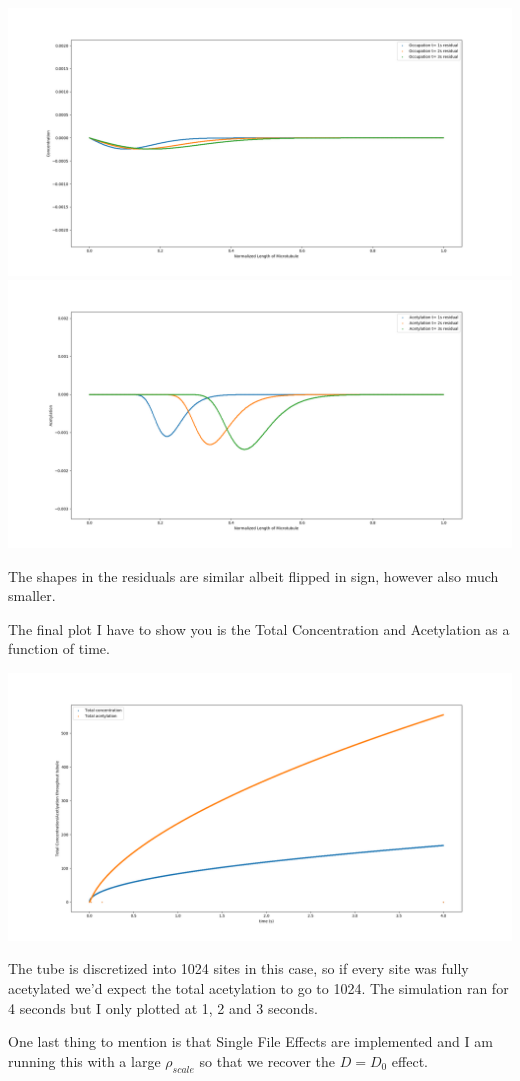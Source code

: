 \documentclass[]{article}
\begin{document}
\includegraphics[width=\linewidth]{OccupationNoSteadyStateMultiplicationResidual}
\includegraphics[width=\linewidth]{AcetylationNoSteadyStateMultiplicationResidual}

The shapes in the residuals are similar albeit flipped in sign, however also much smaller.

The final plot I have to show you is the Total Concentration and Acetylation as a function of time.

\includegraphics[width=\linewidth]{TotalConcentrationandAcetylationasFunctionofTime}

The tube is discretized into 1024 sites in this case, so if every site was fully acetylated we'd expect the total acetylation to go to 1024. The simulation ran for 4 seconds but I only plotted at 1, 2 and 3 seconds. 

One last thing to mention is that Single File Effects are implemented and I am running this with a large $\rho_{scale}$ so that we recover the $D=D_0$ effect.
\end{document}
